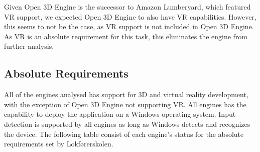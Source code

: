Given Open 3D Engine is the successor to Amazon Lumberyard, which featured VR support, we expected Open 3D Engine to also have VR capabilities. However, this seems to not be the case, as VR support is not included in Open 3D Engine. As VR is an absolute requirement for this task, this eliminates the engine from further analysis. 



















\subsection{Absolute Requirements} \label{absoluterequirements}

All of the engines analysed has support for 3D and virtual reality development, with the exception of Open 3D Engine not supporting VR. All engines has the capability to deploy the application on a Windows operating system. Input detection is supported by all engines as long as Windows detects and recognizes the device. The following table consist of each engine's status for the absolute requirements set by Lokførerskolen.


